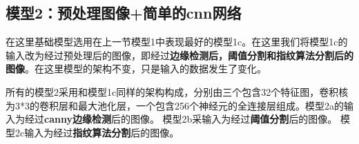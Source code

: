 \FloatBarrier



\subsection{模型2：预处理图像+简单的cnn网络}

在这里基础模型选用在上一节模型1中表现最好的模型1c。在这里我们将模型1c的输入改为经过预处理后的图像，即经过\textbf{边缘检测后，阈值分割和指纹算法分割后的图像}。在这里模型的架构不变，只是输入的数据发生了变化。

所有的模型2采用和模型1c同样的架构构成，分别由三个包含32个特征图，卷积核为3*3的卷积层和最大池化层，一个包含256个神经元的全连接层组成。模型2a的输入为经过\textbf{canny边缘检测}后的图像。
模型2b采输入为经过\textbf{阈值分割}后的图像。
模型2c输入为经过\textbf{指纹算法分割}后的图像。

